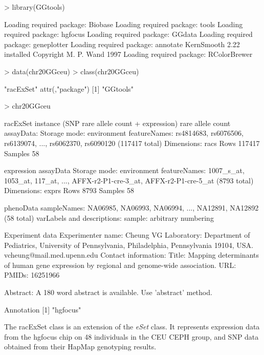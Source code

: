 \documentclass[12pt]{article}
\newcommand{\Rclass}[1]{{\textit{#1}}}
\begin{document}
\begin{Schunk}
\begin{Sinput}
> library(GGtools)
\end{Sinput}
\begin{Soutput}
Loading required package: Biobase
Loading required package: tools
Loading required package: hgfocus
Loading required package: GGdata
Loading required package: geneplotter
Loading required package: annotate
KernSmooth 2.22 installed
Copyright M. P. Wand 1997
Loading required package: RColorBrewer
\end{Soutput}
\begin{Sinput}
> data(chr20GGceu)
> class(chr20GGceu)
\end{Sinput}
\begin{Soutput}
[1] "racExSet"
attr(,"package")
[1] "GGtools"
\end{Soutput}
\begin{Sinput}
> chr20GGceu
\end{Sinput}
\begin{Soutput}
racExSet instance (SNP rare allele count + expression)
rare allele count assayData:
  Storage mode: environment 
  featureNames: rs4814683, rs6076506, rs6139074, ..., rs6062370, rs6090120 (117417 total)
  Dimensions:
          racs
Rows    117417
Samples     58

expression assayData
  Storage mode: environment 
  featureNames: 1007_s_at, 1053_at, 117_at, ..., AFFX-r2-P1-cre-3_at, AFFX-r2-P1-cre-5_at (8793 total)
  Dimensions:
        exprs
Rows     8793
Samples    58

phenoData
  sampleNames: NA06985, NA06993, NA06994, ..., NA12891, NA12892 (58 total)
  varLabels and descriptions:
    sample: arbitrary numbering

Experiment data
  Experimenter name: Cheung VG 
  Laboratory: Department of Pediatrics, University of Pennsylvania, Philadelphia, Pennsylvania 19104, USA. vcheung@mail.med.upenn.edu 
  Contact information:  
  Title: Mapping determinants of human gene expression by regional and genome-wide association. 
  URL:  
  PMIDs: 16251966 

  Abstract: A 180 word abstract is available. Use 'abstract' method.

Annotation [1] "hgfocus"
\end{Soutput}
\end{Schunk}
The racExSet class is an extension of the
\Rclass{eSet} class.  It represents expression
data from the hgfocus chip on 48 individuals in the CEU
CEPH group, and SNP data obtained from their HapMap genotyping
results.
\end{document}
